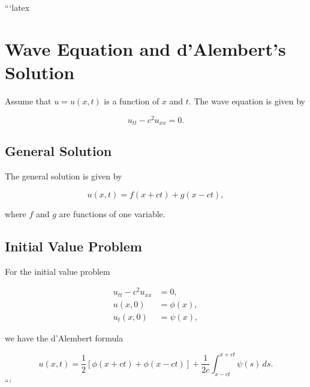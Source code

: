 ```latex
\section*{Wave Equation and d'Alembert's Solution}

Assume that \( u = u(x, t) \) is a function of \( x \) and \( t \). The wave equation is given by

\begin{equation}
    u_{tt} - c^2 u_{xx} = 0.
\end{equation}

\subsection*{General Solution}

The general solution is given by

\begin{equation}
    u(x, t) = f(x + ct) + g(x - ct),
\end{equation}

where \( f \) and \( g \) are functions of one variable.

\subsection*{Initial Value Problem}

For the initial value problem

\begin{align}
    u_{tt} - c^2 u_{xx} &= 0, \\
    u(x, 0) &= \phi(x), \\
    u_t(x, 0) &= \psi(x),
\end{align}

we have the d'Alembert formula

\begin{equation}
    u(x, t) = \frac{1}{2} \left[ \phi(x + ct) + \phi(x - ct) \right] + \frac{1}{2c} \int_{x-ct}^{x+ct} \psi(s) \, ds.
\end{equation}
```
